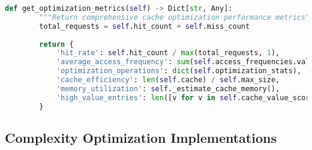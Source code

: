 \begin{lstlisting}[language=Python, caption=Advanced Cache Optimization Strategies]
    def get_optimization_metrics(self) -> Dict[str, Any]:
        """Return comprehensive cache optimization performance metrics"""
        total_requests = self.hit_count + self.miss_count
        
        return {
            'hit_rate': self.hit_count / max(total_requests, 1),
            'average_access_frequency': sum(self.access_frequencies.values()) / max(len(self.access_frequencies), 1),
            'optimization_operations': dict(self.optimization_stats),
            'cache_efficiency': len(self.cache) / self.max_size,
            'memory_utilization': self._estimate_cache_memory(),
            'high_value_entries': len([v for v in self.cache_value_scores.values() if v > 0.7])
        }
\end{lstlisting}

\subsection{Complexity Optimization Implementations}
\label{appendix:complexity-optimization}

